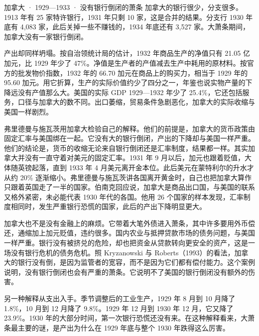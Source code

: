 \begin{case}{加拿大 · 1929—1933 · 没有银行倒闭的萧条}
加拿大的银行很少，分支很多。1913 年有 25 家特许银行，1931 年只剩 10 家，这是合并的结果\cite{cyb1935}。分支行 1930 年底有 4,083 家，此后关掉一些不赚钱的，1934 年底还有 3,527 家\cite{cyb1935}。大萧条期间，加拿大没有一家银行倒闭\cite{brr2011}。

产出却同样坍塌。按自治领统计局的估计，1932 年商品生产的净值只有 21.05 亿加元，比 1929 年少了 47\%\cite{cyb1935}。净值是生产者的产值减去生产中耗用的原材料\cite{cyb1935}。按官方的批发物价指数，1932 年的 66.70 加元在商品上的购买力，相当于 1929 年的 95.60 加元\cite{cyb1935}。用它折算，生产的实际价值约少了四分之一，年鉴也说实物产量的下降远没有产值那么大\cite{cyb1935}。美国的实际 GDP 1929—1932 年少了 25.4\%，它还包括服务，口径与加拿大的数不同\cite{bea2026}。出口萎缩，贸易条件急剧恶化，加拿大的实际收缩与美国一样剧烈\cite{brr2011}。

弗里德曼与施瓦茨用加拿大检验自己的解释。他们的前提是，加拿大的货币政策由固定汇率与美国绑在一起。它没有大的银行倒闭，产出的下降却与美国一样严重。他们的结论是，货币的收缩无论来自银行倒闭还是汇率制度，结果都一样\cite{bernanke2002}。其实加拿大并没有一直守着对美元的固定汇率。1931 年 9 月以后，加元也跟着贬值，大体随英镑起落，直到 1933 年 4 月美元离开金本位。此后美元在蒙特利尔的升水才从约 20\% 逐渐缩小\cite{cyb1935}。弗里德曼与施瓦茨讲各国离开黄金时，自己也把加拿大算作只跟着英国走了一半的国家\cite{bernanke2002}。伯南克回应说，加拿大是商品出口国，与美国的联系又格外紧密，未必能代表 1930 年代的各国。他用 26 个国家的样本发现，汇率制度相同时，发生严重银行恐慌的国家，此后的产出下降明显更大\cite{bernanke2002}。

加拿大也不是没有金融上的麻烦。它带着大笔外债进入萧条，其中许多要用外币偿还，通缩加上加元贬值，违约很多。国内农业与抵押贷款市场的债务问题，与美国一样严重。银行没有被挤兑的危险，却也把资金从贷款转向更安全的资产，这是一场没有银行危机的债务危机\cite{bernanke1983}。照 Kryzanowski 与 Roberts（1993）的看法，加拿大的银行没有倒，是因为监管者的宽容，而不是因为它们都有偿付能力\cite{brr2011}。这个案例说明，没有银行倒闭也会有严重的萧条。它说明不了美国的银行倒闭没有额外的伤害。
\end{case}

另一种解释从支出入手\cite{romer1990}。季节调整后的工业生产，1929 年 8 月到 10 月降了 1.8\%，10 月到 12 月降了 9.8\%。1929 年 12 月到 1930 年 12 月，它又降了 23.9\%\cite{romer1990}。1930 年的大部分时间，第一次银行恐慌还没有来。在这种解释看来，大萧条最主要的谜，是产出为什么在 1929 年底与整个 1930 年跌得这么厉害\cite{romer1990}。

